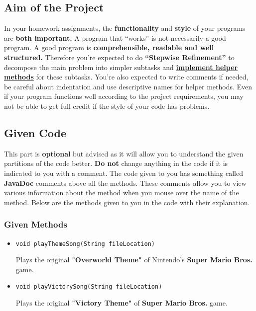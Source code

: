 \documentclass[a4paper]{article}
\begin{document}
\subsection{Aim of the Project}
In your homework assignments, the \textbf{functionality} and \textbf{style} of your programs are \textbf{both important.}  A program that “works” is not necessarily a good program. A good program is \textbf{comprehensible, readable and well structured.} Therefore you’re expected to do \textbf{“Stepwise Refinement”} to decompose the main problem into simpler subtasks and \underline{\textbf{implement helper methods}} for these subtasks.  You’re also expected to write comments if needed, be careful about indentation and use descriptive names for helper methods. Even if your program functions well according to the project requirements, you may not be able to get full credit if the style of your code has problems.

\subsection{Given Code}
This part is \textbf{optional} but advised as it will allow you to understand the given partitions of the code better. \textbf{Do not} change anything in the code if it is indicated to you with a comment. The code given to you has something called \textbf{JavaDoc} comments above all the methods. These comments allow you to view various information about the method when you mouse over the name of the method. Below are the methods given to you in the code with their explanation.

\subsubsection{Given Methods}
\label{themeMethod}
\begin{itemize}

\item

\begin{lstlisting}
void playThemeSong(String fileLocation)
\end{lstlisting}
Plays the original \textbf{"Overworld Theme"} of Nintendo's \textbf{Super Mario Bros.} game.
\item
\begin{lstlisting}
void playVictorySong(String fileLocation)
\end{lstlisting}
Plays the original \textbf{"Victory Theme"} of \textbf{Super Mario Bros.} game.

\end{itemize}
\end{document}
